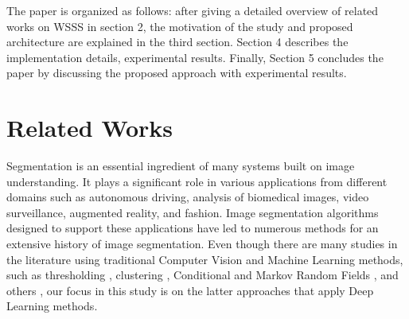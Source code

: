 \documentclass[sn-mathphys]{sn-jnl}
\theoremstyle{thmstyleone}
\theoremstyle{thmstyletwo}\newtheorem{example}{Example}\newtheorem{remark}{Remark}
\theoremstyle{thmstylethree}\newtheorem{definition}{Definition}
\begin{document}
The paper is organized as follows: after giving a detailed overview of related works on WSSS in section 2, the motivation of the study and proposed architecture are explained in the third section. Section 4 describes the implementation details, experimental results. Finally, Section 5 concludes the paper by discussing the proposed approach with experimental results. 


\section{Related Works}\label{related_works}

Segmentation is an essential ingredient of many systems built on image understanding. It plays a significant role in various applications from different domains such as autonomous driving, analysis of biomedical images, video surveillance, augmented reality, and fashion. Image segmentation algorithms designed to support these applications have led to numerous methods for an extensive history of image segmentation. Even though there are many studies in the literature using traditional Computer Vision and Machine Learning methods, such as thresholding \cite{4310076}, clustering \cite{DHANACHANDRA2015764}, Conditional and Markov Random Fields \cite{10.1145/1553374.1553479}, and others \cite{Neubert2014CompactWA, Kass2004SnakesAC, 10.1007/978-3-540-88693-8_52}, our focus in this study is on the latter approaches that apply Deep Learning methods.
\end{document}
